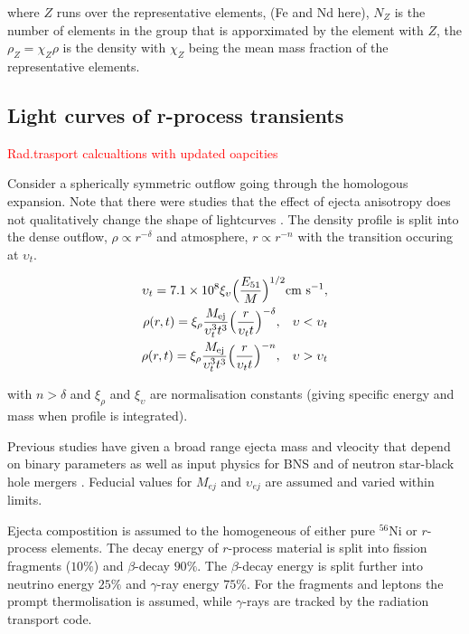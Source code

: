 \documentclass[11pt,a4paper,headinclude=true,DIV=14,BCOR=8mm,chapterprefix,listof=totoc,twoside,openright,abstracton]{scrbook}
\newcommand{\red}[1]{\textcolor{red}{#1}}
\begin{document}
where $Z$ runs over the representative elements, (Fe and Nd here), $N_Z$ is the number of elements in the group that is apporximated by the element with $Z$, the $\rho_Z = \chi_Z \rho$ is the density with $\chi_Z$ being the mean mass fraction of the representative elements. 


\subsection{Light curves of r-process transients}
\red{Rad.trasport calcualtions with updated oapcities}

Consider a spherically symmetric outflow going through the homologous expansion. Note that there were studies that the effect of ejecta anisotropy does not qualitatively change the shape of lightcurves \cite{(Roberts et al. 2011}. The density profile is split into the dense outflow, $\rho\propto r^{-\delta}$ and atmosphere, $r\propto r^{-n}$ with the transition occuring at $\upsilon_t$. 

\begin{eqnarray}
    \upsilon_t = 7.1 \times 10^{8} \xi_{\upsilon} \Big(\frac{E_{51}}{M}\Big)^{1/2} \text{cm s}^{-1}, \\
    \rho(r,t) = \xi_{\rho}\frac{M_{\text{ej}}}{\upsilon_t ^3 t^3}\Big(\frac{r}{\upsilon_t t}\Big)^{-\delta}, \hspace{3mm} \upsilon < \upsilon_t \\
    \rho(r,t) = \xi_{\rho}\frac{M_{\text{ej}}}{\upsilon_t ^3 t^3}\Big(\frac{r}{\upsilon_t t}\Big)^{-n}, \hspace{3mm} \upsilon > \upsilon_t \\
\end{eqnarray}

with $n>\delta$ and $\xi_{\rho}$ and $\xi_{\upsilon}$ are normalisation constants (giving specific energy and mass when profile is integrated).

Previous studies have given a broad range ejecta mass and vleocity that depend on binary parameters as well as input physics for BNS \cite{(e.g. Rosswog et al. 1999; Oechslin et al. 2007; Goriely et al. 2011; Bauswein et al. 2013; Hotokezaka et al. 2013b)} and of neutron star-black hole mergers \cite{(e.g. Janka et al. 1999; Lee 2001; Rosswog 2005)}. Feducial values for $M_{ej}$ and $\upsilon_{ej}$ are assumed and varied within limits. 

Ejecta compostition is assumed to the homogeneous of either pure $^{56}$Ni or $r$-process elements. The decay energy of $r$-process material is split into fission fragments ($10\%$) and $\beta$-decay $90\%$. The $\beta$-decay energy is split further into neutrino energy $25\%$ and $\gamma$-ray energy $75\%$. For the fragments and leptons the prompt thermolisation is assumed, while $\gamma$-rays are tracked by the radiation transport code. 
\end{document}
